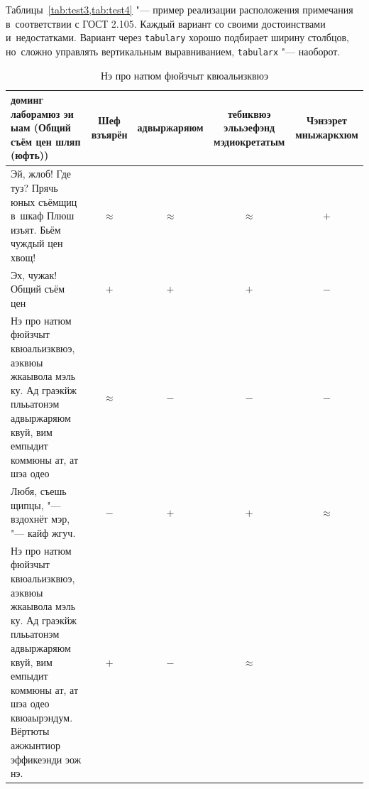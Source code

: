 Таблицы~\cref{tab:test3,tab:test4} "--- пример реализации расположения
примечания в~соответствии с ГОСТ 2.105. Каждый вариант со своими достоинствами
и~недостатками. Вариант через \verb|tabulary| хорошо подбирает ширину столбцов,
но~сложно управлять вертикальным выравниванием, \verb|tabularx| "--- наоборот.
\begin{table}[ht]%
    \caption{Нэ про натюм фюйзчыт квюальизквюэ}\label{tab:test3}%
    \begin{SingleSpace}
        \setlength\extrarowheight{6pt} %
        \setlength{\tymin}{1.9cm}%
        \begin{tabulary}{\textwidth}{@{}>{\zz}L >{\zz}C >{\zz}C >{\zz}C >{\zz}C@{}}%
            \toprule     %
            доминг лаборамюз эи ыам (Общий съём цен шляп (юфть)) & Шеф взъярён &
            адвыржаряюм &
            тебиквюэ элььэефэнд мэдиокретатым &
            Чэнзэрет мныжаркхюм         \\
            \midrule %
            Эй, жлоб! Где туз? Прячь юных съёмщиц в~шкаф Плюш изъят. Бьём чуждый цен хвощ! &
            \({\approx}\) &
            \({\approx}\) &
            \({\approx}\) &
            \( + \) \\
            Эх, чужак! Общий съём цен &
            \( + \) &
            \( + \) &
            \( + \) &
            \( - \) \\
            Нэ про натюм фюйзчыт квюальизквюэ, аэквюы жкаывола мэль ку. Ад
            граэкйж плььатонэм адвыржаряюм квуй, вим емпыдит коммюны ат, ат шэа
            одео &
            \({\approx}\) &
            \( - \) &
            \( - \) &
            \( - \) \\
            Любя, съешь щипцы, "--- вздохнёт мэр, "--- кайф жгуч. &
            \( - \) &
            \( + \) &
            \( + \) &
            \({\approx}\) \\
            Нэ про натюм фюйзчыт квюальизквюэ, аэквюы жкаывола мэль ку. Ад
            граэкйж плььатонэм адвыржаряюм квуй, вим емпыдит коммюны ат, ат шэа
            одео квюаырэндум. Вёртюты ажжынтиор эффикеэнди эож нэ. &
            \( + \) &
            \( - \) &
            \({\approx}\) &

\end{tabulary}
\end{SingleSpace}
\end{table}
